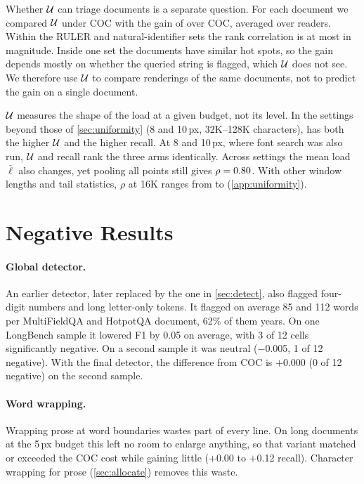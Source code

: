 Whether $\mathcal{U}$ can triage documents is a separate question.
For each document we compared $\mathcal{U}$ under COC with the gain of \name over COC, averaged over readers.
Within the RULER and natural-identifier sets the rank correlation is at most \UtriMax{} in magnitude.
Inside one set the documents have similar hot spots, so the gain depends mostly on whether the queried string is flagged, which $\mathcal{U}$ does not see.
We therefore use $\mathcal{U}$ to compare renderings of the same documents, not to predict the gain on a single document.

$\mathcal{U}$ measures the shape of the load at a given budget, not its level. In the settings beyond those of \cref{sec:uniformity} (8 and 10\,px, 32K--128K characters), \name has both the higher $\mathcal{U}$ and the higher recall. At 8 and 10\,px, where font search was also run, $\mathcal{U}$ and recall rank the three arms identically. Across settings the mean load $\bar\ell$ also changes, yet pooling all \UnAll{} points still gives $\rho=0.80$. With other window lengths and tail statistics, $\rho$ at 16K ranges from \UrhoMin{} to \UrhoMax{} (\cref{app:uniformity}).



\section{Negative Results}
\label{app:negative}

\paragraph{Global detector.}
An earlier detector, later replaced by the one in \cref{sec:detect}, also flagged four-digit numbers and long letter-only tokens.
It flagged on average 85 and 112 words per MultiFieldQA and HotpotQA document, 62\% of them years.
On one LongBench sample it lowered F1 by 0.05 on average, with 3 of 12 cells significantly negative.
On a second sample it was neutral ($-$0.005, 1 of 12 negative).
With the final detector, the difference from COC is $+$0.000 (0 of 12 negative) on the second sample.

\paragraph{Word wrapping.}
Wrapping prose at word boundaries wastes part of every line.
On long documents at the 5\,px budget this left no room to enlarge anything, so that variant matched or exceeded the COC cost while gaining little ($+$0.00 to $+$0.12 recall).
Character wrapping for prose (\cref{sec:allocate}) removes this waste.

